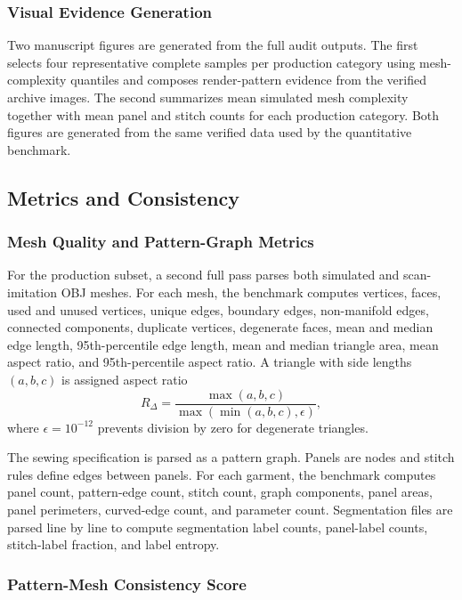 \documentclass[pdflatex,sn-mathphys-num]{sn-jnl}
\begin{document}
\subsubsection{Visual Evidence Generation}

Two manuscript figures are generated from the full audit outputs. The first selects four representative complete samples per production category using mesh-complexity quantiles and composes render-pattern evidence from the verified archive images. The second summarizes mean simulated mesh complexity together with mean panel and stitch counts for each production category. Both figures are generated from the same verified data used by the quantitative benchmark.

\subsection{Metrics and Consistency}

\subsubsection{Mesh Quality and Pattern-Graph Metrics}

For the production subset, a second full pass parses both simulated and scan-imitation OBJ meshes. For each mesh, the benchmark computes vertices, faces, used and unused vertices, unique edges, boundary edges, non-manifold edges, connected components, duplicate vertices, degenerate faces, mean and median edge length, 95th-percentile edge length, mean and median triangle area, mean aspect ratio, and 95th-percentile aspect ratio. A triangle with side lengths $(a,b,c)$ is assigned aspect ratio
\begin{equation}
R_\Delta=\frac{\max(a,b,c)}{\max(\min(a,b,c),\epsilon)} ,
\end{equation}
where $\epsilon=10^{-12}$ prevents division by zero for degenerate triangles.

The sewing specification is parsed as a pattern graph. Panels are nodes and stitch rules define edges between panels. For each garment, the benchmark computes panel count, pattern-edge count, stitch count, graph components, panel areas, panel perimeters, curved-edge count, and parameter count. Segmentation files are parsed line by line to compute segmentation label counts, panel-label counts, stitch-label fraction, and label entropy.

\subsubsection{Pattern-Mesh Consistency Score}
\end{document}
